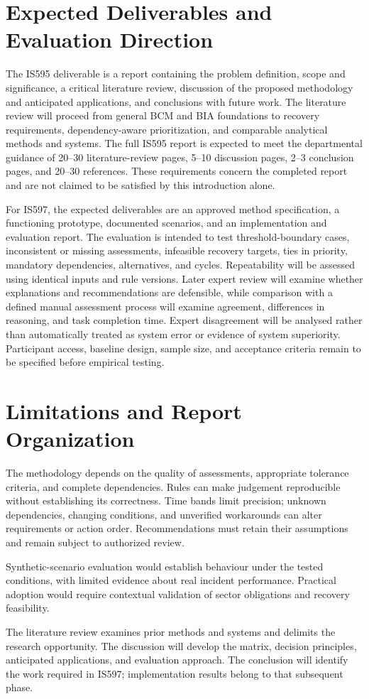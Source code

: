\section{Expected Deliverables and Evaluation Direction}
\label{sec:intro-deliverables}

The IS595 deliverable is a report containing the problem definition, scope and significance, a critical literature review, discussion of the proposed methodology and anticipated applications, and conclusions with future work. The literature review will proceed from general BCM and BIA foundations to recovery requirements, dependency-aware prioritization, and comparable analytical methods and systems. The full IS595 report is expected to meet the departmental guidance of 20--30 literature-review pages, 5--10 discussion pages, 2--3 conclusion pages, and 20--30 references. These requirements concern the completed report and are not claimed to be satisfied by this introduction alone.

For IS597, the expected deliverables are an approved method specification, a functioning prototype, documented scenarios, and an implementation and evaluation report. The evaluation is intended to test threshold-boundary cases, inconsistent or missing assessments, infeasible recovery targets, ties in priority, mandatory dependencies, alternatives, and cycles. Repeatability will be assessed using identical inputs and rule versions. Later expert review will examine whether explanations and recommendations are defensible, while comparison with a defined manual assessment process will examine agreement, differences in reasoning, and task completion time. Expert disagreement will be analysed rather than automatically treated as system error or evidence of system superiority. Participant access, baseline design, sample size, and acceptance criteria remain to be specified before empirical testing.

\section{Limitations and Report Organization}
\label{sec:intro-limitations}

The methodology depends on the quality of assessments, appropriate tolerance criteria, and complete dependencies. Rules can make judgement reproducible without establishing its correctness. Time bands limit precision; unknown dependencies, changing conditions, and unverified workarounds can alter requirements or action order. Recommendations must retain their assumptions and remain subject to authorized review.

Synthetic-scenario evaluation would establish behaviour under the tested conditions, with limited evidence about real incident performance. Practical adoption would require contextual validation of sector obligations and recovery feasibility.

The literature review examines prior methods and systems and delimits the research opportunity. The discussion will develop the matrix, decision principles, anticipated applications, and evaluation approach. The conclusion will identify the work required in IS597; implementation results belong to that subsequent phase.
